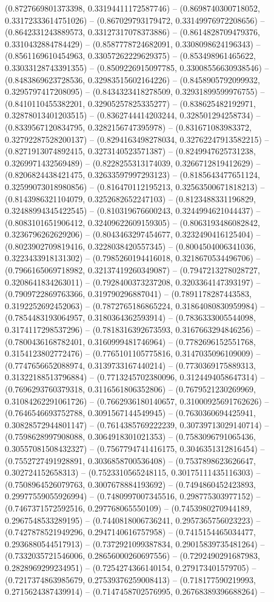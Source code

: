 (0.8727669801373398, 0.33194411172587746) -- (0.8698740300718052, 0.33172333614751026) -- (0.867029793179472, 0.33149976972208656) -- (0.8642331243889573, 0.33127317078373886) -- (0.8614828709479376, 0.3310432884784429) -- (0.8587778724682091, 0.3308098624196343) -- (0.8561169610454963, 0.33057262229629375) -- (0.853498961465622, 0.33033128743391355) -- (0.8509226915097785, 0.33008556630938546) -- (0.8483869623728536, 0.32983515602164226) -- (0.8458905792099932, 0.3295797417208095) -- (0.8434323418278509, 0.32931899599976755) -- (0.8410110455382201, 0.32905257825335277) -- (0.838625482192971, 0.32878013401203515) -- (0.8362744414203244, 0.328501294258734) -- (0.8339567120834795, 0.3282156747395978) -- (0.831671083983372, 0.32792287528200137) -- (0.8294163498278034, 0.32762247913582215) -- (0.8271913074892415, 0.3273140523571387) -- (0.8249947625731238, 0.3269971432569489) -- (0.8228255313174039, 0.3266712819412629) -- (0.8206824438421475, 0.32633597997293123) -- (0.8185643477651124, 0.32599073018980856) -- (0.816470112195213, 0.32563500671818213) -- (0.8143986321104079, 0.3252682652247103) -- (0.8123488331196829, 0.32488994345422545) -- (0.810319676600243, 0.3244994621044437) -- (0.8083101651906412, 0.32409622609159305) -- (0.8063193486082842, 0.3236796262629206) -- (0.8043463297454677, 0.3232490416125404) -- (0.8023902709819416, 0.3228038420557345) -- (0.8004504006341036, 0.3223433918131302) -- (0.7985260194416018, 0.3218670534496706) -- (0.7966165069718982, 0.32137419260349087) -- (0.7947213278028727, 0.3208641834263011) -- (0.7928400373237208, 0.3203364147393197) -- (0.7909722869763366, 0.319790296887041) -- (0.7891178287443583, 0.3192252692452063) -- (0.7872765186865224, 0.31864080830959984) -- (0.7854483193064957, 0.3180364362593914) -- (0.7836333005544098, 0.3174117298537296) -- (0.7818316392673593, 0.3167663294846256) -- (0.7800436168782401, 0.3160999481746964) -- (0.7782696152551768, 0.3154123802772476) -- (0.7765101105775816, 0.3147035096109009) -- (0.7747656652088974, 0.3139733167440214) -- (0.7730369175889313, 0.31322188513796884) -- (0.7713245702380096, 0.3124494058647314) -- (0.7696293760379318, 0.3116561806352806) -- (0.7679521230269969, 0.31084262291061726) -- (0.7662936180140657, 0.31000925691762626) -- (0.7646546693752788, 0.3091567144549945) -- (0.7630360694425941, 0.30828572944801147) -- (0.7614385769222239, 0.30739713029140714) -- (0.7598628997908088, 0.3064918301021353) -- (0.7583096791065436, 0.30557081508432327) -- (0.7567794741416175, 0.3046351312816454) -- (0.7552727491928891, 0.3036858700536408) -- (0.7537898623626647, 0.302724152658313) -- (0.7523310565248115, 0.30175111435116303) -- (0.7508964526079763, 0.3007678884193692) -- (0.7494860452423893, 0.29977559055926994) -- (0.7480997007345516, 0.298775303977152) -- (0.7467371572592516, 0.297768065550109) -- (0.7453980270944189, 0.2967548533289195) -- (0.7440818006736241, 0.2957365756023223) -- (0.7427878521949296, 0.2947140616757958) -- (0.7415154465034477, 0.2936880544517913) -- (0.7372921099387834, 0.29015839735481264) -- (0.7332035721546006, 0.28656000260697556) -- (0.7292490291687983, 0.2828969299234951) -- (0.7254274366140154, 0.279173401579705) -- (0.7217374863985679, 0.27539376259008413) -- (0.718177590219993, 0.2715624387439914) -- (0.7147458702576995, 0.26768389396688264) -- 